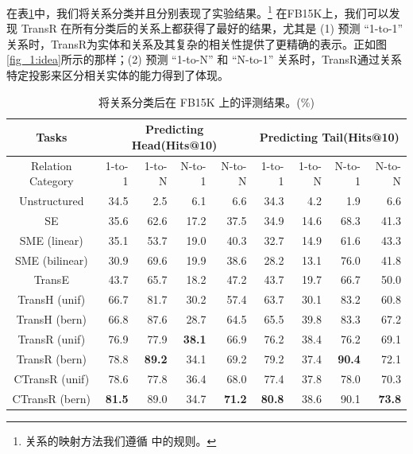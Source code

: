     在表\ref{label_1:mapping_property}中，我们将关系分类并且分别表现了实验结果。\footnote{关系的映射方法我们遵循 \cite{bordes2013translating} 中的规则。} 在FB15K上，我们可以发现 TransR 在所有分类后的关系上都获得了最好的结果，尤其是 (1) 预测 ``1-to-1'' 关系时，TransR为实体和关系及其复杂的相关性提供了更精确的表示。正如图\ref{fig_1:idea}所示的那样；(2) 预测 ``1-to-N'' 和 ``N-to-1'' 关系时，TransR通过关系特定投影来区分相关实体的能力得到了体现。

    \begin{table}[htb]
    \small
    \centering
    \caption{将关系分类后在 FB15K 上的评测结果。($\%$)}
     \label{label_1:mapping_property}
    \begin{tabular}{|c|rrrr|rrrr|}
    \hline
    Tasks &\multicolumn{4}{|c|}{Predicting Head(Hits@10)}&\multicolumn{4}{|c|}{Predicting Tail(Hits@10)}\\
    \hline
    Relation Category&1-to-1&1-to-N&N-to-1&N-to-N&1-to-1&1-to-N&N-to-1&N-to-N\\
    \hline
    Unstructured \cite{bordes2012joint}           & 34.5  &   2.5 &   6.1 &   6.6 & 34.3 &   4.2 &   1.9 &   6.6\\
    SE \cite{bordes2011learning}                     & 35.6  & 62.6 & 17.2 & 37.5 & 34.9 & 14.6 & 68.3 & 41.3\\
    SME (linear)   \cite{bordes2012joint}          & 35.1  & 53.7 & 19.0 & 40.3 & 32.7 & 14.9 & 61.6 & 43.3\\
    SME (bilinear) \cite{bordes2012joint}         & 30.9  & 69.6 & 19.9 & 38.6 & 28.2 & 13.1 & 76.0 & 41.8\\
    TransE \cite{bordes2013translating}          &43.7   & 65.7 & 18.2 & 47.2 & 43.7 & 19.7 & 66.7 & 50.0\\
    TransH (unif)  \cite{wang2014knowledge} & 66.7  & 81.7 &  30.2 & 57.4 & 63.7 & 30.1 & 83.2 & 60.8\\
    TransH (bern) \cite{wang2014knowledge} & 66.8  & 87.6 &  28.7 & 64.5 & 65.5 & 39.8 & 83.3 & 67.2\\
    \hline
    TransR (unif)  & 76.9&  77.9&\textbf{38.1}&66.9&76.2&38.4&76.2&69.1
    \\
    TransR (bern) & 78.8&\textbf{89.2}&34.1&69.2&79.2&37.4&\textbf{90.4}&72.1
     \\
    CTransR (unif) &78.6&77.8&36.4&68.0&77.4& 37.8& 78.0&70.3\\
    CTransR (bern)& \textbf{81.5}&89.0&34.7&\textbf{71.2}&\textbf{80.8}&38.6&90.1&\textbf{73.8}
    \\
    \hline
    \end{tabular}
    \end{table}

